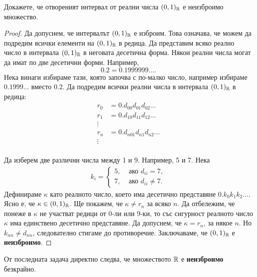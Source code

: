 \begin{problem}
  Докажете, че отвореният интервал от реални числа $(0,1)_{\mathbb{R}}$ е неизброимо множество.
\end{problem}
\begin{proof}
  Да допуснем, че интервалът $(0,1)_{\mathbb{R}}$ е изброим. Това означава, че можем да подредим всички елементи на $(0,1)_{\mathbb{R}}$ в редица.
  Да представим всяко реално число в интервала $(0,1)_{\mathbb{R}}$ в неговата десетична форма.
  Някои реални числа могат да имат по две десетични форми.
  Например, 
  \[0.2 = 0.1999999\dots.\]
  Нека винаги избираме тази, която започва с по-малко число, например избираме $0.1999\dots$ вместо $0.2$.
  Да подредим всички реални числа в интервала $(0,1)_{\mathbb{R}}$ в редица:
  \begin{align*}
    r_0 & = 0.d_{00}d_{01}d_{02}\dots\\
    r_1 & = 0.d_{10}d_{11}d_{12}\dots\\
    \vdots\\
    r_n & = 0.d_{n01}d_{n1}d_{n2}\dots\\
    \vdots\\
  \end{align*}

  Да изберем две различни числа между 1 и 9. Например, 5 и 7.
  Нека 
  \begin{align*}
    k_i = 
    \begin{cases}
      5, & \mbox{ ако } d_{ii} = 7,\\
      7, & \mbox{ ако } d_{ii} \neq 7.
    \end{cases}
  \end{align*}
  Дефинираме $\kappa$ като реалното число, което има десетично представяне $0.k_0k_1k_2\dots$.
  Ясно е, че $\kappa \in (0,1)_{\mathbb{R}}$. Ще покажем, че $\kappa \neq r_n$ за всяко $n$.
  Да отбележим, че понеже в $\kappa$ не участват редици от $0$-ли или $9$-ки, то със сигурност 
  реалното число $\kappa$ има единствено десетично представяне.
  Да допуснем, че $\kappa = r_n$, за някое $n$.
  Но $k_{nn} \neq d_{nn}$, следователно стигаме до противоречие.
  Заключаваме, че $(0,1)_{\mathbb{R}}$ е {\bf неизброимо}.
\end{proof}

\begin{remark}
  От последната задача директно следва, че множеството $\mathbb{R}$ е {\bf неизброимо} безкрайно.
\end{remark}


